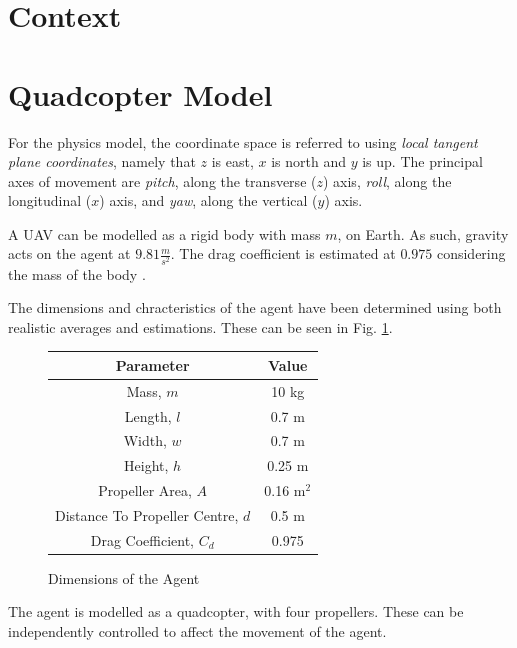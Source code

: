 \documentclass{article}
\begin{document}
\section{Context}

\section{Quadcopter Model}

For the physics model, the coordinate space is referred to using \emph{local tangent plane coordinates}, namely that $z$ is east, $x$ is north and $y$ is up. The principal axes of movement are \emph{pitch}, along the transverse ($z$) axis, \emph{roll}, along the longitudinal ($x$) axis, and \emph{yaw}, along the vertical ($y$) axis.

A UAV can be modelled as a rigid body with mass $m$, on Earth. As such, gravity acts on the agent at $9.81\frac{m}{s^2}$. The drag coefficient is estimated at $0.975$ considering the mass of the body \cite{Hattenberger}.

The dimensions and chracteristics of the agent have been determined using both realistic averages \cite{Figliozzi} and estimations. These can be seen in Fig. \ref{fig:dimensions}.

\begin{figure}[H]
    \centering
    \begin{tabular}{| c | c |} 
    \hline
    Parameter & Value \\ 
    \hline
    Mass, $m$ & 10 kg \\
    \hline
    Length, $l$ & 0.7 m \\
    \hline
    Width, $w$ & 0.7 m \\
    \hline
    Height, $h$ & 0.25 m \\
    \hline
    Propeller Area, $A$ & 0.16 m$^2$ \\
    \hline
    Distance To Propeller Centre, $d$ & 0.5 m \\
    \hline
    Drag Coefficient, $C_d$ & 0.975 \\
    \hline
    \end{tabular}
    \caption{Dimensions of the Agent}
    \label{fig:dimensions}
\end{figure}

The agent is modelled as a quadcopter, with four propellers. These can be independently controlled to affect the movement of the agent.
\end{document}

